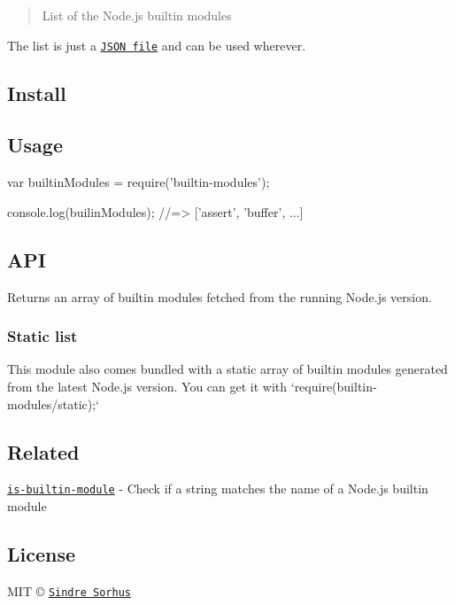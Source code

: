 \begin{quote}
List of the Node.\+js builtin modules \end{quote}


The list is just a \href{builtin-modules.json}{\tt J\+S\+ON file} and can be used wherever.

\subsection*{Install}




\subsection*{Usage}


\begin{DoxyCode}
var builtinModules = require('builtin-modules');

console.log(builinModules);
//=> ['assert', 'buffer', ...]
\end{DoxyCode}


\subsection*{A\+PI}

Returns an array of builtin modules fetched from the running Node.\+js version.

\subsubsection*{Static list}

This module also comes bundled with a static array of builtin modules generated from the latest Node.\+js version. You can get it with `require(\textquotesingle{}builtin-\/modules/static\textquotesingle{});`

\subsection*{Related}


\begin{DoxyItemize}
\item \href{https://github.com/sindresorhus/is-builtin-module}{\tt is-\/builtin-\/module} -\/ Check if a string matches the name of a Node.\+js builtin module
\end{DoxyItemize}

\subsection*{License}

M\+IT © \href{http://sindresorhus.com}{\tt Sindre Sorhus} 